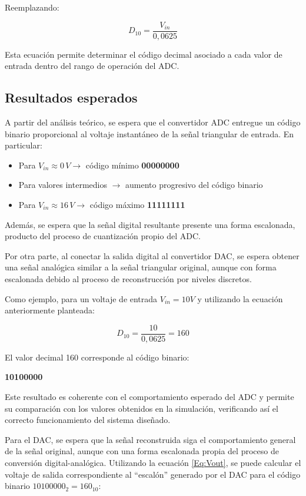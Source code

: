 \documentclass[12pt,letterpaper]{article}
\begin{document}
    Reemplazando:

    \[
        D_{10} = \frac{V_{in}}{0,0625}
    \]

    Esta ecuación permite determinar el código decimal asociado a cada valor de entrada dentro del rango de operación del ADC.

    \subsection{Resultados esperados}

    A partir del análisis teórico, se espera que el convertidor ADC entregue un código binario proporcional al voltaje instantáneo de la señal triangular de entrada. En particular:
    
    \begin{itemize}
        \item Para $V_{in} \approx 0 \, V \rightarrow$ código mínimo \textbf{00000000}
        \item Para valores intermedios $\rightarrow$ aumento progresivo del código binario
        \item Para $V_{in} \approx 16 \, V \rightarrow$ código máximo \textbf{11111111}
    \end{itemize}
    
    Además, se espera que la señal digital resultante presente una forma escalonada, producto del proceso de cuantización propio del ADC.
    
    Por otra parte, al conectar la salida digital al convertidor DAC, se espera obtener una señal analógica similar a la señal triangular original, aunque con forma escalonada debido al proceso de reconstrucción por niveles discretos.
    
    Como ejemplo, para un voltaje de entrada $V_{in} = 10V$ y utilizando la ecuación anteriormente planteada:
    
    \[
    D_{10} = \frac{10}{0,0625} = 160
    \]
    
    El valor decimal 160 corresponde al código binario:
    
    \begin{center}
        \textbf{10100000}
    \end{center}
    
    Este resultado es coherente con el comportamiento esperado del ADC y permite su comparación con los valores obtenidos en la simulación, verificando así el correcto funcionamiento del sistema diseñado.

    Para el DAC, se espera que la señal reconstruida siga el comportamiento general de la señal original, aunque con una forma escalonada propia del proceso de conversión digital-analógica. Utilizando la ecuación \ref{Eq:Vout}, se puede calcular el voltaje de salida correspondiente al \enquote{escalón} generado por el DAC para el código binario $1010 0000_2 = 160_{10}$:
\end{document}
